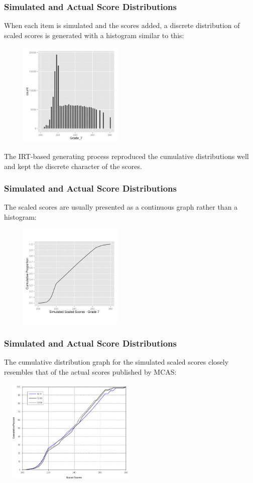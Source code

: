 \documentclass{beamer}
\begin{document}
\begin{frame}
\frametitle{Simulated and Actual Score Distributions}
When each item is simulated and the scores added, a discrete distribution of scaled scores is generated with a histogram similar to this:
\par\vspace{0.3 cm}
\includegraphics[width=7cm,height=5cm]{hist_Grade7.png}
\par\vspace{0.1 cm}
The IRT-based generating process reproduced the cumulative distributions well and kept the discrete character of the scores.
\end{frame}

\begin{frame}
\frametitle{Simulated and Actual Score Distributions}
The scaled scores are usually presented as a continuous graph rather than a histogram:
\par\vspace{0.3 cm}
\includegraphics[width=7cm,height=5cm]{grade7sim.png}
\end{frame}
\begin{frame}

\frametitle{Simulated and Actual Score Distributions}
The cumulative distribution graph for the simulated scaled scores closely resembles that of the actual scores published by MCAS:
\par\vspace{0.3 cm}
\includegraphics[width=7cm,height=5cm]{grade7.png}
\end{frame}
\end{document}
